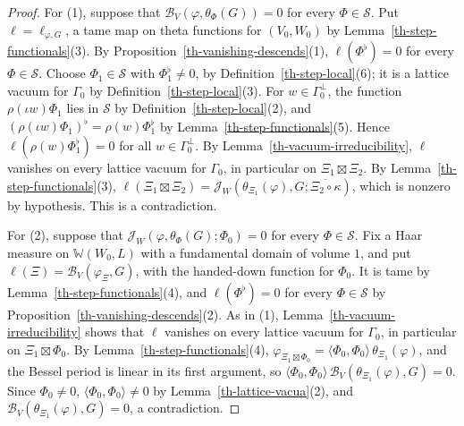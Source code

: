 \begin{proof}
For (1), suppose that $\mathcal B_V(\varphi,\theta_\Phi(G))=0$ for every
$\Phi\in\mathcal S$. Put $\ell=\ell_{\varphi,G}$, a tame map on theta functions
for $(V_0,W_0)$ by Lemma~\ref{th-step-functionals}(3). By
Proposition~\ref{th-vanishing-descends}(1), $\ell(\Phi^\flat)=0$ for every
$\Phi\in\mathcal S$. Choose $\Phi_1\in\mathcal S$ with $\Phi_1^\flat\neq0$, by
Definition~\ref{th-step-local}(6); it is a lattice vacuum for $\Gamma_0$ by
Definition~\ref{th-step-local}(3). For $w\in\Gamma_0^\perp$, the function
$\rho(\iota w)\Phi_1$ lies in $\mathcal S$ by Definition~\ref{th-step-local}(2),
and $(\rho(\iota w)\Phi_1)^\flat=\rho(w)\Phi_1^\flat$ by
Lemma~\ref{th-step-functionals}(5). Hence $\ell(\rho(w)\Phi_1^\flat)=0$ for all
$w\in\Gamma_0^\perp$. By Lemma~\ref{th-vacuum-irreducibility}, $\ell$ vanishes
on every lattice vacuum for $\Gamma_0$, in particular on $\Xi_1\boxtimes\Xi_2$.
By Lemma~\ref{th-step-functionals}(3),
$\ell(\Xi_1\boxtimes\Xi_2)=\mathcal J_W(\theta_{\Xi_1}(\varphi),G;\overline{\Xi_2\circ\kappa})$,
which is nonzero by hypothesis. This is a contradiction.

For (2), suppose that $\mathcal J_W(\varphi,\theta_\Phi(G);\Phi_0)=0$ for every
$\Phi\in\mathcal S$. Fix a Haar measure on $\mathbb W(W_0,L)$ with a fundamental
domain of volume $1$, and put $\ell(\Xi)=\mathcal B_V(\varphi_\Xi,G)$, with the
handed-down function for $\Phi_0$. It is tame by
Lemma~\ref{th-step-functionals}(4), and $\ell(\Phi^\flat)=0$ for every
$\Phi\in\mathcal S$ by Proposition~\ref{th-vanishing-descends}(2). As in (1),
Lemma~\ref{th-vacuum-irreducibility} shows that $\ell$ vanishes on every lattice
vacuum for $\Gamma_0$, in particular on $\Xi_1\boxtimes\Phi_0$. By
Lemma~\ref{th-step-functionals}(4),
$\varphi_{\Xi_1\boxtimes\Phi_0}=\langle\Phi_0,\Phi_0\rangle\,\theta_{\Xi_1}(\varphi)$,
and the Bessel period is linear in its first argument, so
$\langle\Phi_0,\Phi_0\rangle\,\mathcal B_V(\theta_{\Xi_1}(\varphi),G)=0$. Since
$\Phi_0\neq0$, $\langle\Phi_0,\Phi_0\rangle\neq0$ by
Lemma~\ref{th-lattice-vacua}(2), and $\mathcal B_V(\theta_{\Xi_1}(\varphi),G)=0$,
a contradiction.
\end{proof}

